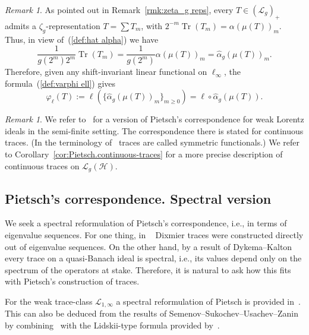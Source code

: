 \documentclass[10pt, a4paper]{amsart}
\newcommand{\sL}{\mathscr{L}}
\newcommand{\sH}{\mathscr{H}}
\newcommand{\op}{\operatorname}
\newcommand{\Tr}{\op{Tr}}
\numberwithin{equation}{section}
\theoremstyle{definition}
\theoremstyle{remark}
\newtheorem{remark}[theorem]{Remark}
\begin{document}
\begin{remark}
 As pointed out in Remark~\ref{rmk:zeta_g reps}, every $T\in (\sL_g)_+$ admits a $\zeta_g$-representation $T=\sum T_m$, with $2^{-m}\Tr(T_m)=\alpha(\mu(T))_m$. Thus, in view of~(\ref{def:hat alpha}) we have
 \begin{equation*}
 \frac{1}{g(2^m)2^m} \Tr(T_m)= \frac{1}{g(2^m)}\alpha(\mu(T))_m=\hat{\alpha}_g(\mu(T))_m.
\end{equation*}
Therefore, given any shift-invariant linear functional on $\ell_\infty$, the formula~(\ref{def:varphi ell}) gives
\begin{equation*}
  \varphi_\ell(T):= \ell\left( \big\{\hat{\alpha}_g(\mu(T))_m \big\}_{m\geq 0}\right)= \ell\circ \hat{\alpha}_g(\mu(T)).
\end{equation*}
\end{remark}

\begin{remark}\label{rmk:semi-finite}
We refer to~\cite[Theorem~3.5]{LU:JMAA25} for a version of Pietsch's correspondence for weak Lorentz ideals in the semi-finite setting. The correspondence there is stated for continuous traces. (In the terminology of~\cite{LU:JMAA25} traces are called symmetric functionals.) We refer to Corollary~\ref{cor:Pietsch.continuous-traces} for a more precise description of continuous traces on $\sL_g(\sH)$.
\end{remark}

\subsection{Pietsch's correspondence. Spectral version}
We seek a spectral reformulation of Pietsch's correspondence, i.e., in terms of eigenvalue sequences. For one thing, in ~\cite{PT:Part1} Dixmier traces were constructed directly out of eigenvalue sequences. On the other hand, by a result of Dykema--Kalton~\cite{DK:Crelle98} every trace on a quasi-Banach ideal is spectral, i.e., its values depend only on the spectrum of the operators at stake. Therefore, it is natural to ask how this fits with Pietsch's construction of traces.

For the weak trace-class $\sL_{1,\infty}$ a spectral reformulation of Pietsch is provided in~\cite[Chapter~6]{LSZ:Book}. This can also be deduced from the results of Semenov--Sukochev--Usachev--Zanin~\cite{SSUZ:AIM15} by combining~\cite[Theorem~4.1]{SSUZ:AIM15} with the Lidskii-type formula provided by~\cite[Theorem~6.3]{SSUZ:AIM15}.
\end{document}
